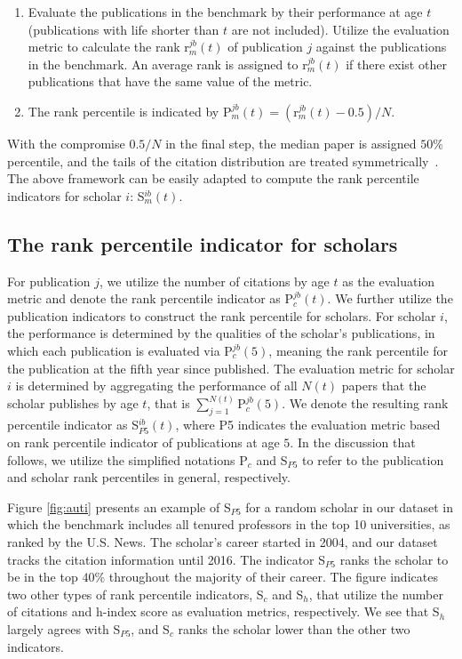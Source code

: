 \begin{enumerate}[label=(\arabic*)]
    \item Evaluate the publications in the benchmark by their performance at age $t$ (publications with life shorter than $t$ are not included). Utilize the evaluation metric to calculate the rank r$_{m}^{jb}(t)$ of publication $j$ against the publications in the benchmark. An average rank is assigned to r$_{m}^{jb}(t)$ if there exist other publications that have the same value of the metric. 
    \item The rank percentile is indicated by $\text{P}_{m}^{jb}(t)= \left(\text{r}_{m}^{jb}(t)-0.5\right)/N$.
\end{enumerate}
With the compromise $0.5/N$ in the final step, the median paper is assigned $50\%$ percentile, and the tails of the citation distribution are treated symmetrically~\cite{allen1914storage}. The above framework can be easily adapted to compute the rank percentile indicators for scholar $i$: S$_{m}^{ib}(t)$.


\subsection*{The rank percentile indicator for scholars}

For publication $j$, we utilize the number of citations by age $t$ as the evaluation metric and denote the rank percentile indicator as P$_c^{jb}(t)$. We further utilize the publication indicators to construct the rank percentile for scholars. For scholar $i$, the performance is determined by the qualities of the scholar's publications, in which each publication is evaluated via P$_c^{jb}(5)$, meaning the rank percentile for the publication at the fifth year since published. The evaluation metric for scholar $i$ is determined by aggregating the performance of all $N(t)$ papers that the scholar publishes by age $t$, that is $\displaystyle \sum_{j=1}^{N(t)} \text{P}_c^{jb}(5)$. We denote the resulting rank percentile indicator as S$_{P5}^{ib}(t)$, where P5 indicates the evaluation metric based on rank percentile indicator of publications at age $5$. In the discussion that follows, we utilize the simplified notations P$_c$ and S$_{P5}$ to refer to the publication and scholar rank percentiles in general, respectively. 

Figure \ref{fig:auti} presents an example of S$_{P5}$ for a random scholar in our dataset in which the benchmark includes all tenured professors in the top 10 universities, as ranked by the U.S. News. The scholar's career started in 2004, and our dataset tracks the citation information until 2016. The indicator S$_{P5}$ ranks the scholar to be in the top $40\%$ throughout the majority of their career. The figure indicates two other types of rank percentile indicators, S$_c$ and S$_h$, that utilize the number of citations and h-index score as evaluation metrics, respectively. We see that S$_h$ largely agrees with S$_{P5}$, and S$_c$ ranks the scholar lower than the other two indicators. 

